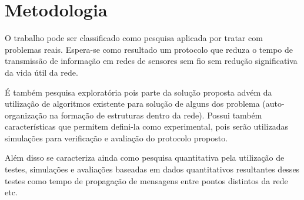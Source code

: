\section{Metodologia}

O trabalho pode ser classificado como pesquisa aplicada por tratar com problemas reais. Espera-se como resultado um protocolo que reduza o tempo de transmissão de informação em redes de sensores sem fio sem redução significativa da vida útil da rede. 

É também pesquisa exploratória pois parte da solução proposta advém da utilização de algoritmos existente para solução de alguns dos problema (auto-organização na formação de estruturas dentro da rede). Possui também características que permitem defini-la como experimental, pois serão utilizadas simulações para verificação e avaliação do protocolo proposto.

Além disso se caracteriza ainda como pesquisa quantitativa pela utilização de testes, simulações e avaliações baseadas em dados quantitativos resultantes desses testes como tempo de propagação de mensagens entre pontos distintos da rede etc.
